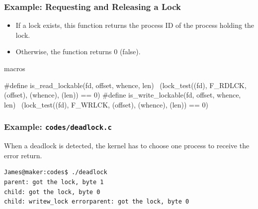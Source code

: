 \documentclass[newPxFont,sthlmFooter,nooffset]{beamer}
\begin{document}
\begin{frame}[t, fragile]
  \frametitle{Example: Requesting and Releasing a Lock}

  \begin{itemize}
  \item If a lock exists, this function returns the process ID of the
    process holding the lock.
  \item Otherwise, the function returns 0 (false).
  \end{itemize}

macros
\begin{codedef}
#define is_read_lockable(fd, offset, whence, len) \
        (lock_test((fd), F_RDLCK, (offset), (whence), (len)) == 0)
#define is_write_lockable(fd, offset, whence, len) \
        (lock_test((fd), F_WRLCK, (offset), (whence), (len)) == 0)
\end{codedef}

\end{frame}

\begin{frame}
  \frametitle{Example: \texttt{codes/deadlock.c}}



When a deadlock is detected, the kernel has to choose one process to receive the error return.

\begin{verbatim}
James@maker:codes$ ./deadlock
parent: got the lock, byte 1
child: got the lock, byte 0
child: writew_lock errorparent: got the lock, byte 0
\end{verbatim}
\end{frame}
\end{document}
